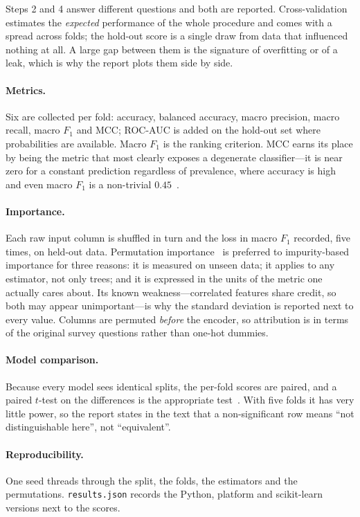 \documentclass[11pt,a4paper]{article}
\begin{document}
Steps 2 and 4 answer different questions and both are reported.
Cross-validation estimates the \emph{expected} performance of the whole
procedure and comes with a spread across folds; the hold-out score is a single
draw from data that influenced nothing at all. A large gap between them is the
signature of overfitting or of a leak, which is why the report plots them side
by side.

\paragraph{Metrics.} Six are collected per fold: accuracy, balanced accuracy,
macro precision, macro recall, macro $F_1$ and MCC; ROC-AUC is added on the
hold-out set where probabilities are available. Macro $F_1$ is the ranking
criterion. MCC earns its place by being the metric that most clearly exposes a
degenerate classifier---it is near zero for a constant prediction regardless of
prevalence, where accuracy is high and even macro $F_1$ is a non-trivial
$0.45$~\cite{mcc}.

\paragraph{Importance.} Each raw input column is shuffled in turn and the loss
in macro $F_1$ recorded, five times, on held-out data. Permutation
importance~\cite{permimp} is preferred to impurity-based importance for three
reasons: it is measured on unseen data; it applies to any estimator, not only
trees; and it is expressed in the units of the metric one actually cares about.
Its known weakness---correlated features share credit, so both may appear
unimportant---is why the standard deviation is reported next to every value.
Columns are permuted \emph{before} the encoder, so attribution is in terms of
the original survey questions rather than one-hot dummies.

\paragraph{Model comparison.} Because every model sees identical splits, the
per-fold scores are paired, and a paired $t$-test on the differences is the
appropriate test~\cite{dietterich}. With five folds it has very little power,
so the report states in the text that a non-significant row means ``not
distinguishable here'', not ``equivalent''.

\paragraph{Reproducibility.} One seed threads through the split, the folds, the
estimators and the permutations. \texttt{results.json} records the Python,
platform and scikit-learn versions next to the scores.
\end{document}
